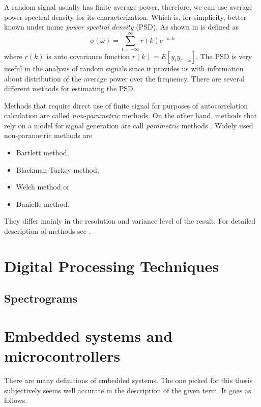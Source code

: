 \documentclass[twoside]{ctuthesis}
\theoremstyle{plain}
\theoremstyle{definition}
\theoremstyle{note}
\begin{document}
A random signal usually has finite average power, therefore, we can use average power spectral density for its characterization. Which is, for simplicity, better known under name \textit{power spectral density} (PSD). As shown in \cite{cite:SAoS} is defined as
\begin{equation} \label{eq:PSD1}
\phi(\omega) = \sum_{t=-\infty}^{\infty}r(k)e^{-i\omega k}
\end{equation}
where $r(k)$ is auto covariance function $r(k) = E[y_{t}y_{t+k}]$.
The PSD is very useful in the analysis of random signals since it provides us with information about distribution of the average power over the frequency. There are several different methods for estimating the PSD. 

Methods that require direct use of finite signal for purposes of autocorrelation calculation are called \textit{non-parametric} methods. On the other hand, methods that rely on a model for signal generation are call \textit{parametric} methods \cite{cite:RT_DSP}. Widely used non-parametric methods are

\begin{itemize}
	\setlength{\itemsep}{5pt}
\item Bartlett method,
\item Blackman-Turkey method,
\item Welch method or
\item Danielle method.
\end{itemize}

They differ mainly in the resolution and variance level of the result. For detailed description of methods see \cite{cite:2}.

\section{Digital Processing Techniques}

\subsection{Spectrograms}

\section{Embedded systems and microcontrollers}
There are many definitions of embedded systems. The one picked for this thesis subjectively seems well accurate in the description of the given term. It goes as follows.
\end{document}
